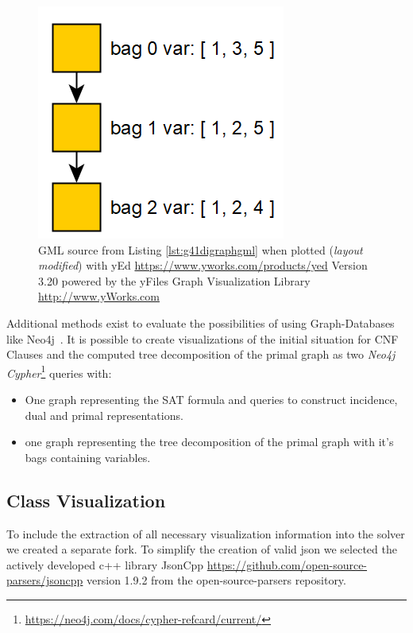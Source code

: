 \documentclass[a4paper, 12pt, bibliography=totoc]{scrartcl}
\begin{document}
\begin{figure}[h]
	\centering
	\includegraphics[]{images/gmlexamplepic.png}
	\caption{GML source from Listing \ref{lst:g41digraphgml} when plotted (\textit{layout modified}) with yEd {\url{https://www.yworks.com/products/yed} Version 3.20 powered by the yFiles Graph Visualization Library \url{http://www.yWorks.com}} }
	\label{fig:gmlexamplepic}
\end{figure}
Additional methods exist to evaluate the possibilities of using Graph-Databases like Neo4j~\cite{graphdatabases}.
It is possible to create visualizations of the initial situation for CNF Clauses and the computed tree decomposition of the primal graph as two \textit{Neo4j Cypher}\footnote{\url{https://neo4j.com/docs/cypher-refcard/current/}} queries with:
\begin{itemize}
	\item One graph representing the SAT formula and  queries to construct incidence, dual and primal representations.
	\item one graph representing the tree decomposition of the primal graph with it's bags containing variables.
\end{itemize}

\subsection{Class Visualization}

To include the extraction of all necessary visualization information into the solver we created a separate fork.
To simplify the creation of valid json we selected the actively developed c++ library JsonCpp \url{https://github.com/open-source-parsers/jsoncpp} version 1.9.2 from the open-source-parsers repository.
\end{document}
